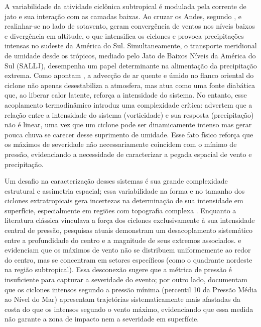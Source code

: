 A variabilidade da atividade ciclônica subtropical é modulada pela corrente de jato e sua interação com as camadas baixas. Ao cruzar os Andes, segundo \citet{vera2002cold}, e realinhar-se no lado de sotavento, geram convergência de ventos nos níveis baixos e divergência em altitude, o que intensifica os ciclones e provoca precipitações intensas no sudeste da América do Sul. Simultaneamente, o transporte meridional de umidade desde os trópicos, mediado pelo Jato de Baixos Níveis da América do Sul (SALLJ), desempenha um papel determinante na alimentação da precipitação extrema. Como apontam \citet{reboita2022from}, a advecção de ar quente e úmido no flanco oriental do ciclone não apenas desestabiliza a atmosfera, mas atua como uma fonte diabática que, ao liberar calor latente, reforça a intensidade do sistema. No entanto, esse acoplamento termodinâmico introduz uma complexidade crítica: \citet{sinclair2023relationship} advertem que a relação entre a intensidade do sistema (vorticidade) e sua resposta (precipitação) não é linear, uma vez que um ciclone pode ser dinamicamente intenso mas gerar pouca chuva se carecer desse suprimento de umidade. Esse fato físico reforça que os máximos de severidade não necessariamente coincidem com o mínimo de pressão, evidenciando a necessidade de caracterizar a pegada espacial de vento e precipitação.


Um desafio na caracterização desses sistemas é sua grande complexidade estrutural e assimetria espacial; essa variabilidade na forma e no tamanho dos ciclones extratropicais gera incertezas na determinação de sua intensidade em superfície, especialmente em regiões com topografia complexa \citep{neu2013intercomparison}. Enquanto a literatura clássica vinculava a força dos ciclones exclusivamente à sua intensidade central de pressão, pesquisas atuais demonstram um desacoplamento sistemático entre a profundidade do centro e a magnitude de seus extremos associados. \citet{bitencourt2010relating} e \citet{cardoso2022synoptic} evidenciam que os máximos de vento não se distribuem uniformemente ao redor do centro, mas se concentram em setores específicos (como o quadrante nordeste na região subtropical). Essa desconexão sugere que a métrica de pressão é insuficiente para capturar a severidade do evento; por outro lado, \citet{cardoso2022synoptic} documentam que os ciclones intensos segundo a pressão mínima (percentil 10 da Pressão Média ao Nível do Mar) apresentam trajetórias sistematicamente mais afastadas da costa do que os intensos segundo o vento máximo, evidenciando que essa medida não garante a zona de impacto nem a severidade em superfície.

